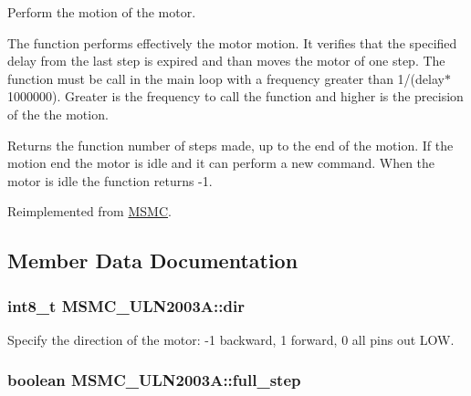 Perform the motion of the motor. 

The function performs effectively the motor motion. It verifies that the specified delay from the last step is expired and than moves the motor of one step. The function must be call in the main loop with a frequency greater than 1/(delay$\ast$1000000). Greater is the frequency to call the function and higher is the precision of the the motion. \begin{DoxyReturn}{Returns}
the function number of steps made, up to the end of the motion. If the motion end the motor is idle and it can perform a new command. When the motor is idle the function returns -\/1. 
\end{DoxyReturn}


Reimplemented from \hyperlink{class_m_s_m_c_a44ca6bc355a269543606dd4eeb7ed06e}{M\+S\+M\+C}.



\subsection{Member Data Documentation}
\hypertarget{class_m_s_m_c___u_l_n2003_a_af8b9f054cc60da4bb45567f80c907b94}{
\subsubsection[{dir}]{\setlength{\rightskip}{0pt plus 5cm}int8\+\_\+t M\+S\+M\+C\+\_\+\+U\+L\+N2003\+A\+::dir\hspace{0.3cm}{\ttfamily [private]}}}\label{class_m_s_m_c___u_l_n2003_a_af8b9f054cc60da4bb45567f80c907b94}


Specify the direction of the motor\+: -\/1 backward, 1 forward, 0 all pins out L\+O\+W. 

\hypertarget{class_m_s_m_c___u_l_n2003_a_a073628fcb2caa42e31ee542e7baffea9}{
\subsubsection[{full\+\_\+step}]{\setlength{\rightskip}{0pt plus 5cm}boolean M\+S\+M\+C\+\_\+\+U\+L\+N2003\+A\+::full\+\_\+step\hspace{0.3cm}{\ttfamily [private]}}}\label{class_m_s_m_c___u_l_n2003_a_a073628fcb2caa42e31ee542e7baffea9}


